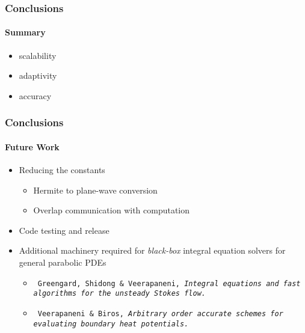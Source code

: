 \begin{frame}
\frametitle{Conclusions}
\framesubtitle{Summary}

\begin{itemize}
\item  scalability 
\item  adaptivity
\item  accuracy
\end{itemize}

\end{frame}


\begin{frame}
\frametitle{Conclusions}
\framesubtitle{Future Work}
\begin{itemize}
\item  Reducing the constants
         \begin{itemize}
	\item Hermite to plane-wave conversion
            \item Overlap communication with computation
         \end{itemize}
\item  Code testing and release
%
\item Additional machinery required for {\em black-box} integral equation solvers for general parabolic PDEs 
          \begin{itemize}
	 \item  {\footnotesize \texttt{ Greengard, Shidong \& Veerapaneni, {\em Integral equations and fast algorithms for the unsteady  Stokes  flow.}}}
             \item {\footnotesize \texttt{ Veerapaneni \& Biros, {\em Arbitrary order accurate schemes for evaluating boundary heat potentials.}}}
          \end{itemize}
\end{itemize}

\end{frame}